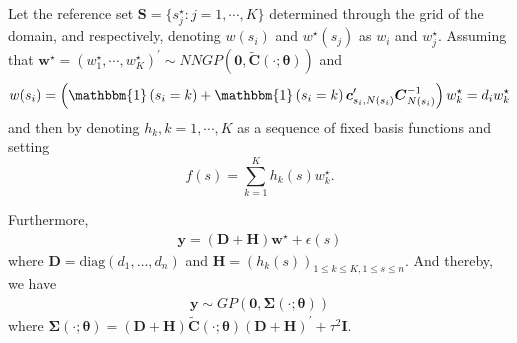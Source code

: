 \documentclass[
12pt, %
a4paper, %
oneside, %
headinclude,footinclude, %
BCOR5mm, %
]{scrartcl}
\begin{document}
\begin{itemize}
Let the reference set $\boldsymbol{S} = \{s_j^{\star}: j = 1, \cdots, K\}$ determined through the grid of the domain, and respectively, denoting  
$w(s_i)$ and $w^{\star}(s_j)$ as $w_i$ and $w^{\star}_j$. Assuming that $\boldsymbol{w}^{\star} = \left(w_1^{\star}, \cdots, w_K^{\star}\right)^\prime \sim NNGP\left(\boldsymbol{0}, \boldsymbol{\tilde{C}}(\cdot; \boldsymbol{\theta})\right)$ and 
$$w(s_i) = \left(\mathbbm{1}\left(s_i=k\right) + \mathbbm{1}\left(s_i=k\right)\boldsymbol{c}_{s_i, N(s_i)}^\prime \boldsymbol{C}_{N(s_i)}^{-1}\right)w^{\star}_k  = d_iw^{\star}_k$$
and then by denoting $h_{k}, k = 1, \cdots, K$ as a sequence of fixed basis functions and setting 
$$f(s) = \sum_{k = 1}^{K}h_{k}(s)w_{k}^{\star}.$$

Furthermore, 
\begin{equation}
\begin{aligned}
\boldsymbol{y} = \left(\boldsymbol{D} + \boldsymbol{H}\right)\boldsymbol{w}^{\star} + \epsilon(s)
\end{aligned} \label{DP12}
\end{equation}
where $\boldsymbol{D} = \text{diag}\left(d_1, \dots, d_n\right)$ and $\boldsymbol{H} = \left(h_{k}(s)\right)_{1 \leq k \leq K, 1 \leq s \leq n}$. And thereby, we have
\begin{equation}
\begin{aligned}
\boldsymbol{y} \sim GP\left(\boldsymbol{0}, \boldsymbol{\Sigma}(\cdot; \boldsymbol{\theta})\right)
\end{aligned} \label{DP13}
\end{equation}
where $\boldsymbol{\Sigma}(\cdot; \boldsymbol{\theta}) = \left(\boldsymbol{D} + \boldsymbol{H}\right) \boldsymbol{\tilde{C}}(\cdot; \boldsymbol{\theta})\left(\boldsymbol{D} + \boldsymbol{H}\right)^\prime + \tau^2\boldsymbol{I}.$


\end{itemize}
\end{document}
